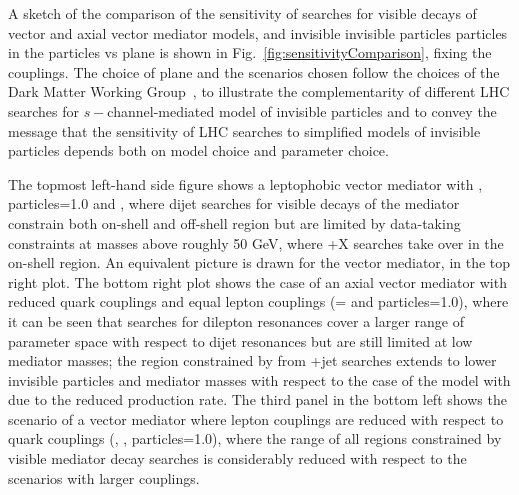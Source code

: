A sketch of the comparison of the sensitivity of searches for visible decays of vector and axial vector mediator models, and invisible invisible particles particles 
in the \minvisible particles vs \mmed plane is shown in Fig.~\ref{fig:sensitivityComparison}, fixing the couplings. The choice of plane and the scenarios chosen follow the choices of the Dark Matter Working Group~\cite{Albert:2017onk}, to illustrate the complementarity of different LHC searches for $s-$channel-mediated model of invisible particles and to convey the message that the sensitivity of LHC searches to simplified models of invisible particles depends both on model choice and parameter choice. 

The topmost left-hand side figure shows a leptophobic vector mediator with , \ginvisible particles=1.0 and , where dijet searches for visible decays of the mediator constrain both on-shell and off-shell region but are limited by data-taking constraints at masses above roughly 50 GeV, where \MET+X searches take over in the on-shell region. An equivalent picture is drawn for the vector mediator, in the top right plot. The bottom right plot shows the case of an axial vector mediator with reduced quark couplings and equal lepton couplings (\gq= and \ginvisible particles=1.0), where it can be seen that searches for dilepton resonances cover a larger range of parameter space with respect to dijet resonances but are still limited at low mediator masses; the region constrained by from \MET+jet searches extends to lower invisible particles and mediator masses with respect to the case of the model with  due to the reduced production rate. The third panel in the bottom left shows the scenario of a vector mediator where lepton couplings are reduced with respect to quark couplings (, , \ginvisible particles=1.0), where the range of all regions constrained by visible mediator decay searches is considerably reduced with respect to the scenarios with larger couplings. 

